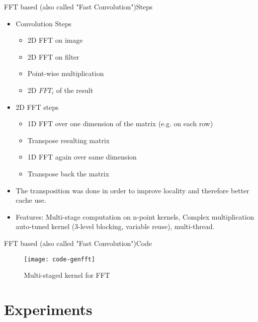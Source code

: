 \documentclass{beamer}
\begin{document}
\begin{frame}{FFT based (also called "Fast Convolution")}{Steps}
  \begin{itemize}
        \item {
           Convolution Steps
          }
      \begin{itemize}
          \item {
           2D FFT on image
          }
          \item {
           2D FFT on filter
          }
          \item {
           Point-wise multiplication
          }
          \item {
           2D $FFT_i$ of the result
          }
      \end{itemize}
      \item {
           2D FFT steps
          }
      \begin{itemize}
          \item {
           1D FFT over one dimension of the matrix (e.g. on each row)
          }
          \item {
           Transpose resulting matrix
          }
          \item {
           1D FFT again over same dimension
          }
          \item {
           Transpose back the matrix
          }
      \end{itemize}
       \item {
            The transposition was done in order to improve locality and therefore better cache use.
         }
          \item {
            Features: Multi-stage computation on n-point kernels, Complex multiplication auto-tuned kernel (3-level blocking, variable reuse),  multi-thread.
         }
  \end{itemize}
\end{frame}

\begin{frame}{FFT based (also called "Fast Convolution")}{Code}
\begin{figure}[ht] \label{fig1} 
\texttt{[image: code-genfft]}
 \caption{Multi-staged kernel for FFT} 
\end{figure}

\end{frame}

\section{Experiments}
\end{document}
